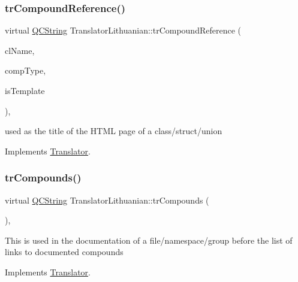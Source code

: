 \subsubsection{\texorpdfstring{trCompoundReference()}{trCompoundReference()}}
{\footnotesize\ttfamily virtual \mbox{\hyperlink{class_q_c_string}{Q\+C\+String}} Translator\+Lithuanian\+::tr\+Compound\+Reference (\begin{DoxyParamCaption}\item[{const char $\ast$}]{cl\+Name,  }\item[{\mbox{\hyperlink{class_class_def_ae70cf86d35fe954a94c566fbcfc87939}{Class\+Def\+::\+Compound\+Type}}}]{comp\+Type,  }\item[{bool}]{is\+Template }\end{DoxyParamCaption})\hspace{0.3cm}{\ttfamily [inline]}, {\ttfamily [virtual]}}

used as the title of the H\+T\+ML page of a class/struct/union 

Implements \mbox{\hyperlink{class_translator}{Translator}}.

\mbox{\label{class_translator_lithuanian_a76bca305caae8f4f20536ecdb191b276}} 
\subsubsection{\texorpdfstring{trCompounds()}{trCompounds()}}
{\footnotesize\ttfamily virtual \mbox{\hyperlink{class_q_c_string}{Q\+C\+String}} Translator\+Lithuanian\+::tr\+Compounds (\begin{DoxyParamCaption}{ }\end{DoxyParamCaption})\hspace{0.3cm}{\ttfamily [inline]}, {\ttfamily [virtual]}}

This is used in the documentation of a file/namespace/group before the list of links to documented compounds 

Implements \mbox{\hyperlink{class_translator}{Translator}}.

\mbox{\label{class_translator_lithuanian_a450cd9b143c1d612bfb5ac64288e68bd}} 
